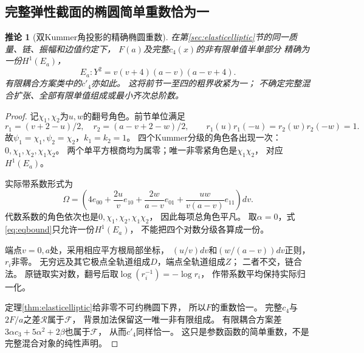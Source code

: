\documentclass[11pt,a4paper]{ctexart}
\theoremstyle{cnplain}\newtheorem{theorem}{定理}[section]
\newtheorem{corollary}[theorem]{推论}
\theoremstyle{definition}\newtheorem{definition}[theorem]{定义}
\theoremstyle{remark}\newtheorem{remark}[theorem]{注}
\begin{document}
\subsection{完整弹性截面的椭圆简单重数恰为一}
\begin{corollary}[双Kummer角投影的精确椭圆重数]\label{cor:elasticone}
在第\ref{sec:elasticelliptic}节的同一质量、链、振幅和边值约定下，
$F(a)$及完整$c_4(x)$的非有限单值半单部分
精确为一份$H^1(E_a)$，
\[
 E_a:Y^2=v(v+4)(a-v)(a-v+4).
\]
有限耦合方案类中的$c'_4$亦如此。
这将前节一至四的粗界收紧为一；
不确定完整混合扩张、全部有限单值组成或最小齐次总阶数。
\end{corollary}
\begin{proof}
记$\chi_1,\chi_2$为$u,w$的翻号角色。前节单位满足
\[
 r_1=(v+2-u)/2,\quad r_2=(a-v+2-w)/2,\qquad
 r_1(u)r_1(-u)=r_2(w)r_2(-w)=1.
\]
故$\psi_1=\chi_1,\psi_2=\chi_2$，$k_1=k_2=1$。
四个Kummer分级的角色各出现一次：
$0,\chi_1,\chi_2,\chi_1\chi_2$。
两个单平方根商均为属零；唯一非零紧角色是$\chi_1\chi_2$，
对应$H^1(E_a)$。

实际带系数形式为
\[
 \Omega=\left(4e_{00}+\frac{2u}{v}e_{10}
       +\frac{2w}{a-v}e_{01}
       +\frac{uw}{v(a-v)}e_{11}\right)dv .
\]
代数系数的角色依次也是$0,\chi_1,\chi_2,\chi_1\chi_2$，
因此每项总角色平凡。
取$\alpha=0$，式\eqref{eq:eqbound}只允许一份$H^1(E_a)$，
不能把四个对数分级各算成一份。

端点$v=0,a$处，采用相应平方根局部坐标，
$(u/v)dv$和$(w/(a-v))dv$正则，$r_i$非零。
无穷远及其它极点全轨道组成$D$，端点全轨道组成$Z$；
二者不交，链合法。
原链取实对数，翻号后取$\log(r_i^{-1})=-\log r_i$，
作带系数平均保持实际归一化。

定理\ref{thm:elasticelliptic}给非零不可约椭圆下界，
所以$F$的重数恰一。
完整$c_4$与$2F/a$之差$\mathcal R$属于$\mathcal F$，
背景加法保留这一唯一非有限组成。
有限耦合方案差$3\alpha c_3+5\alpha^2+2\beta$也属于$\mathcal F$，
从而$c'_4$同样恰一。
这只是参数函数的简单重数，不是完整混合对象的纯性声明。
\end{proof}
\end{document}
